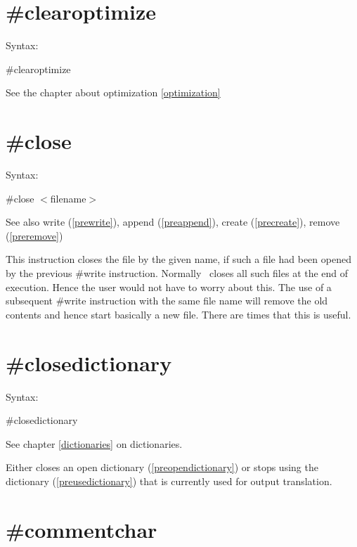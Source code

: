 
\section{\#clearoptimize}
\label{preclearoptimize}

\noindent Syntax:

\#clearoptimize

See the chapter about optimization \ref{optimization}
 

\section{\#close}
\label{preclose}

\noindent Syntax:

\#close $<$filename$>$
 
\noindent See also write (\ref{prewrite}), append (\ref{preappend}),
            create (\ref{precreate}), remove (\ref{preremove})

\noindent This instruction closes the file 
by the given name, if such a file had been opened by the previous 
\#write instruction. Normally \FORM\ closes all such files at 
the end of execution. Hence the user would not have to worry about this. 
The use of a subsequent \#write instruction with the same file name will 
remove the old contents and hence start basically a new file. There are 
times that this is useful.

 
\section{\#closedictionary}
\label{preclosedictionary}

\noindent Syntax:

\#closedictionary
 
\noindent See chapter \ref{dictionaries} on dictionaries.

\noindent Either closes an open dictionary (\ref{preopendictionary}) or stops 
using the dictionary (\ref{preusedictionary}) that is currently used for output 
translation.


\section{\#commentchar}
\label{precommentchar}

